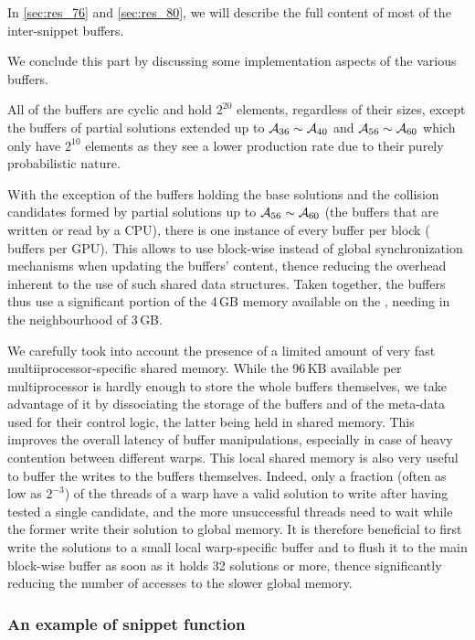 In \autoref{sec:res_76} and \autoref{sec:res_80}, we will describe the full content of most of the inter-snippet buffers.

\bigskip

We conclude this part by discussing some implementation aspects of the various buffers.

All of the buffers are cyclic and hold $2^{20}$ elements, regardless of their sizes, except the buffers of partial solutions extended up to
$\mathcal{A}_{36} \sim \mathcal{A}_{40}$ and $\mathcal{A}_{56} \sim \mathcal{A}_{60}$ which only have $2^{10}$ elements as they see a lower production rate due to their purely probabilistic nature.

With the exception of the buffers holding the base solutions and the collision candidates formed by partial solutions
up to $\mathcal{A}_{56} \sim \mathcal{A}_{60}$ (\ie the buffers that are written or read by a CPU),
there is one instance of every buffer per block ( buffers per GPU). This allows to use block-wise instead of global
synchronization mechanisms when updating the buffers' content,
thence reducing the overhead inherent to the use of such shared data structures.
Taken together, the buffers thus use a significant portion of the 4\,GB memory available on the \gtx, needing in the neighbourhood of 3\,GB.

We carefully took into account the presence of a limited amount of
very fast multii\-processor-specific shared memory. While the 96\,KB available per multiprocessor is
hardly enough to store the whole buffers themselves, we take advantage of it by dissociating the storage of
the buffers and of the meta-data used for their control logic, the latter being held in
shared memory. This improves the overall latency of buffer manipulations, especially in case of
heavy contention between different warps. This local shared memory is also very useful to buffer
the writes to the buffers themselves. Indeed, only a fraction (often as low as $2^{-3}$)
of the threads of a warp have a valid solution to write after having tested a single candidate,
and the more unsuccessful threads need to wait while the former write their solution to global memory.
It is therefore beneficial to first write the solutions to a small local warp-specific buffer and to
flush it to the main block-wise buffer as soon as it holds 32 solutions or more, thence
significantly reducing the number of accesses to the slower global memory.


\subsubsection{An example of snippet function}
\label{sec:snippet}

